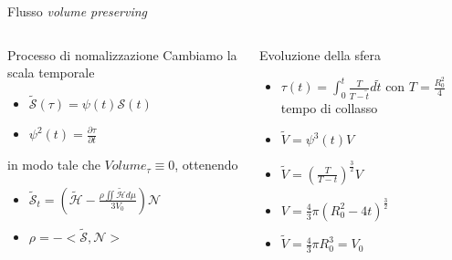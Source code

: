 \begin{frame}{Flusso \emph{volume preserving}}
  \begin{columns}[T]
    \begin{column}{6cm}
      \begin{block}{Processo di nomalizzazione}
        Cambiamo la scala temporale
        \begin{itemize}
        \item $\mathcal{\tilde{S}(\tau)}=\psi(t)\mathcal{S}(t)$ 
        \item $\psi^2(t)=\frac{\partial\tau}{\partial t}$
        \end{itemize}
         in modo tale che \alert{$Volume_{\tau}\equiv 0$}, ottenendo   
         \begin{itemize}
         \item $\mathcal{\tilde{S}}_t=\left(\mathcal{\tilde{H}}-\frac{\rho\iint\mathcal{\tilde{H}}d\mu}{3V_0}\right)\mathcal{N}$
         \item $\rho =-<\mathcal{\tilde{S}},\mathcal{N}>$
         \end{itemize}
      \end{block}
    \end{column}
    \begin{column}[T]{4cm}
      \begin{exampleblock}{Evoluzione della sfera}
        \begin{itemize}
        \item $\tau(t)=\int_0^t\frac{T}{T-\tilde{t}}d\tilde{t}$ con
          $T=\frac{R_0^2}{4}$ tempo di 
          collasso
        \item $\tilde{V}=\psi^3(t)V$
        \item $\tilde{V}=\left(\frac{T}{T-t}\right)^{\frac{3}{2}}V$
        \item $V=\frac{4}{3}\pi(R_0^2-4t)^{\frac{3}{2}}$
        \item $\tilde{V}=\frac{4}{3}\pi R_0^3=V_0$
        \end{itemize}
      \end{exampleblock}
    \end{column}
  \end{columns}
\end{frame}

